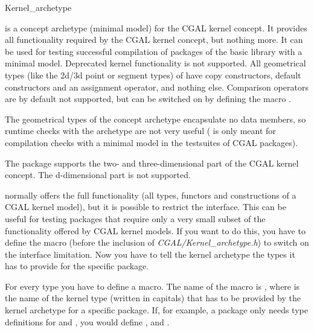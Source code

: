 \begin{ccRefClass}{Kernel_archetype}


\ccDefinition

 is a concept archetype (minimal model) for the CGAL kernel concept.
It provides all functionality required by the CGAL kernel concept, but nothing more.
It can be used for testing successful compilation of packages of the basic library with a minimal
model. Deprecated kernel functionality is not supported. All geometrical types (like the 2d/3d point or segment types)
of  have
copy constructors, default constructors and an assignment operator, and nothing else.
Comparison operators are by default not supported, but can be switched on by defining the macro
.

The geometrical types of the concept archetype encapsulate no data members, so runtime checks with the archetype
are not very useful ( is only meant for compilation checks with a minimal model in the testsuites
of CGAL packages).

The package supports the two- and three-dimensional part of the CGAL kernel concept. The d-dimensional
part is not supported.

 normally offers the full functionality (all types, functors and constructions
of a CGAL kernel model), but it is possible to restrict the interface. This can be useful
for testing packages that require only a very small subset of the functionality offered
by CGAL kernel models.
If you want to do this, you have to define the macro  
(before the inclusion of {\em CGAL/Kernel\_archetype.h}) to switch on the interface limitation. 
Now you have to tell the kernel archetype the types it has to provide for the specific package.

For every type you have to define a macro.
The name of the macro is , where  is the name
of the kernel type (written in capitals) that has to be provided by the kernel archetype for a specific package.
If, for example, a package only needs type definitions for  and , you would
define ,  and  .

\ccIsModel
{}


\end{ccRefClass}
